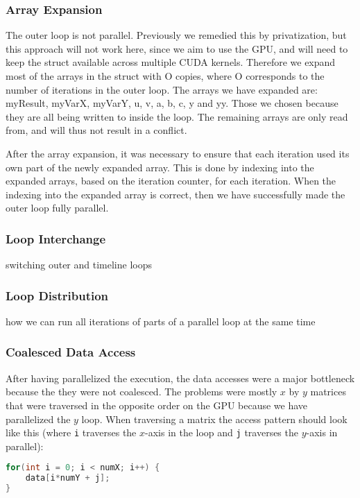 \documentclass[11pt]{article}
\begin{document}
\subsubsection{Array Expansion}
The outer loop is not parallel. Previously we remedied this by privatization,
but this approach will not work here, since we aim to use the GPU, and will 
need to keep the struct available across multiple CUDA kernels. Therefore we
expand most of the arrays in the struct with O copies, where O corresponds to
the number of iterations in the outer loop. The arrays we have expanded are:
myResult, myVarX, myVarY, u, v, a, b, c, y and yy. Those we chosen because 
they are all being written to inside the loop. The remaining arrays are only 
read from, and will thus not result in a conflict. 

After the array expansion,
it was necessary to ensure that each iteration used its own part of the newly
expanded array. This is done by indexing into the expanded arrays, based on the
iteration counter, for each iteration. When the indexing into the expanded
array is correct, then we have successfully made the outer loop fully parallel.


\subsubsection{Loop Interchange}
switching outer and timeline loops

\subsubsection{Loop Distribution}
how we can run all iterations of parts of a parallel loop at the same time


\subsubsection{Coalesced Data Access}
After having parallelized the execution, the data accesses were a major bottleneck because the they were not coalesced.
The problems were mostly $x$ by $y$ matrices that were traversed in the opposite order on the GPU because we have parallelized the $y$ loop.
When traversing a matrix the access pattern should look like this (where \texttt{i} traverses the $x$-axis in the loop and \texttt{j} traverses the $y$-axis in parallel):
\begin{lstlisting}[language=C]
for(int i = 0; i < numX; i++) {
	data[i*numY + j];
}
\end{lstlisting}
\end{document}
